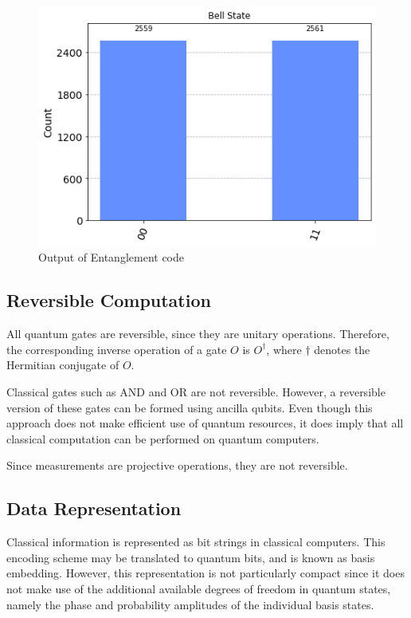 \documentclass{article}
\begin{document}
\begin{figure}[h]
\centering

\includegraphics[scale=0.5]{code_snippets/entanglement_output.png}


\caption{Output of Entanglement code}

\end{figure}




\subsection{Reversible Computation}

All quantum gates are reversible, since they are unitary operations. Therefore, the corresponding inverse operation of a gate $O$ is $ O^\dagger$, where $\dagger$ denotes the Hermitian conjugate of $ O $.


Classical gates such as AND and OR are not reversible. However, a reversible version of these gates can be formed using ancilla qubits. Even though this approach does not make efficient use of quantum resources, it does imply that all classical computation can be performed on quantum computers.

Since measurements are projective operations, they are not reversible.


\subsection{Data Representation}

Classical information is represented as bit strings in classical computers. This encoding scheme may be translated to quantum bits, and is known as basis embedding. However, this representation is not particularly compact since it does not make use of the additional available degrees of freedom in quantum states, namely the phase and probability amplitudes of the individual basis states. 
\end{document}
